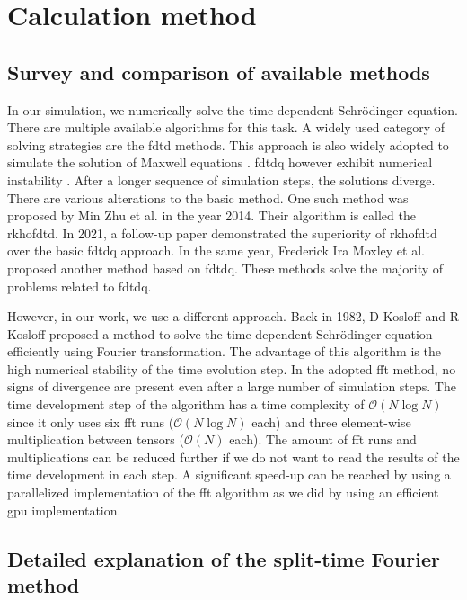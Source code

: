 \section{Calculation method}
\label{sec:used_method}

\subsection{Survey and comparison of available methods}

In our simulation, we numerically solve the time-dependent Schrödinger equation.
There are multiple available algorithms for this task.
A widely used category of solving strategies are the \acrfull{fdtd} methods.
This approach is also widely adopted to simulate the solution of Maxwell equations \cite{maxwell1865, Ulf2001}.
\acrfull{fdtdq} however exhibit numerical instability \cite{Soriano2004}.
After a longer sequence of simulation steps, the solutions diverge.
There are various alterations to the basic method.
One such method was proposed by Min Zhu et al. \cite{Zhu2014} in the year 2014.
Their algorithm is called the \acrfull{rkhofdtd}.
In 2021, a follow-up paper \cite{Zhu_Wang_2021} demonstrated the superiority of \acrshort{rkhofdtd} over the basic \acrshort{fdtdq} approach.
In the same year, Frederick Ira Moxley et al. \cite{MOXLEY20122434} proposed another method based on \acrshort{fdtdq}.
These methods solve the majority of problems related to \acrshort{fdtdq}.

However, in our work, we use a different approach.
Back in 1982, D Kosloff and R Kosloff proposed a method \cite{KOSLOFF198335} to solve the time-dependent Schrödinger equation efficiently using Fourier transformation.
The advantage of this algorithm is the high numerical stability of the time evolution step.
In the adopted \acrshort{fft} method, no signs of divergence are present even after a large number of simulation steps.
The time development step of the algorithm has a time complexity of $\mathcal{O}(N\log N)$ since it only uses six \acrshort{fft} runs ($\mathcal{O}(N\log N)$ each) and three element-wise multiplication between tensors ($\mathcal{O}(N)$ each).
The amount of \acrshort{fft} runs and multiplications can be reduced further if we do not want to read the results of the time development in each step.
A significant speed-up can be reached by using a parallelized implementation of the \acrshort{fft} algorithm as we did by using an efficient \acrshort{gpu} implementation.

\subsection{Detailed explanation of the split-time Fourier method}

